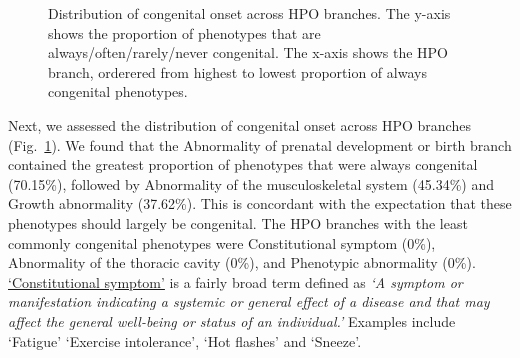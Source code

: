 \documentclass[
]{agujournal2019}
\begin{document}
\label{cell-fig-congenital-branches}
\begin{figure}[H]


\caption{\label{fig-congenital-branches}Distribution of congenital onset
across HPO branches. The y-axis shows the proportion of phenotypes that
are always/often/rarely/never congenital. The x-axis shows the HPO
branch, orderered from highest to lowest proportion of always congenital
phenotypes.}

\end{figure}%

Next, we assessed the distribution of congenital onset across HPO
branches (Fig.~\ref{fig-congenital-branches}). We found that the
Abnormality of prenatal development or birth branch contained the
greatest proportion of phenotypes that were always congenital (70.15\%),
followed by Abnormality of the musculoskeletal system (45.34\%) and
Growth abnormality (37.62\%). This is concordant with the expectation
that these phenotypes should largely be congenital. The HPO branches
with the least commonly congenital phenotypes were Constitutional
symptom (0\%), Abnormality of the thoracic cavity (0\%), and Phenotypic
abnormality (0\%).
\href{https://hpo.jax.org/app/browse/term/HP:0025142}{`Constitutional
symptom'} is a fairly broad term defined as \emph{`A symptom or
manifestation indicating a systemic or general effect of a disease and
that may affect the general well-being or status of an individual.'}
Examples include `Fatigue' `Exercise intolerance', `Hot flashes' and
`Sneeze'.
\end{document}

